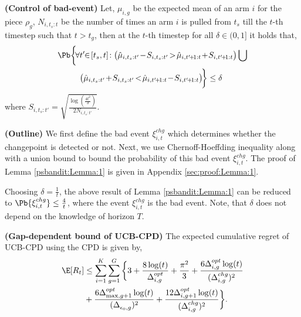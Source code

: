 
\begin{customlemma}{3} \textbf{(Control of bad-event)}
\label{psbandit:Lemma:1}
Let, $\mu_{i,g}$ be the expected mean of an arm $i$ for the piece $\rho_{g}$, $N_{i,t_s:t}$ be the number of times an arm $i$ is pulled from $t_s$ till the $t$-th timestep such that $t>t_{g}$, then at the $t$-th timestep for all $\delta\in (0,1]$  it holds that,
\begin{align*}
\Pb\bigg\lbrace\!\forall & t'\!\!\in\! [t_s , t]\!: \big(\hat{\mu}_{i,t_s:t'} \!-\! S_{i,t_s:t'} \!>\! \hat{\mu}_{i,t'\!+\!1:t} \!+\! S_{i,t'\!+\!1:t}\big) \bigcup\\
 & \big(\hat{\mu}_{i,t_s:t'} \!+\!  S_{i,t_s:t'} \!<\! \hat{\mu}_{i,t'\!+\!1:t} \!-\! S_{i,t'\!+\!1:t} \big)\!\bigg\rbrace \leq \delta
\end{align*}
where $S_{i,t_s:t'} = \sqrt{\frac{\log(\frac{4t^2}{\delta})}{2N_{i,t_s:t'}}}$.
\end{customlemma}

\begin{customproof}{2} \textbf{(Outline)} We first define the bad event $\xi^{chg}_{i,t}$  which determines whether the changepoint is detected or not. Next, we use Chernoff-Hoeffding inequality along with a union bound to bound the probability of this bad event $\xi^{chg}_{i,t}$.
The proof of Lemma \ref{psbandit:Lemma:1} is given in Appendix \ref{sec:proof:Lemma:1}.
\end{customproof}

\begin{remark}
\label{Rem:1}
Choosing $\delta=\frac{1}{t}$, the above result of Lemma \ref{psbandit:Lemma:1} can be reduced to $\Pb\lbrace \xi^{chg}_{i,t}\rbrace \leq \frac{4}{t}$, where the event $\xi^{chg}_{i,t}$ is the bad event. Note, that $\delta$ does not depend on the knowledge of horizon $T$.
\end{remark}


\begin{customtheorem}{1}\textbf{(Gap-dependent bound of UCB-CPD)}
\label{psbandit:Theorem:1}
The expected cumulative regret of UCB-CPD using the CPD is given by,
\begin{align*}
\E[R_t]  &\leq \sum_{i=1}^{K}\sum_{g=1}^{G} \bigg\lbrace 3 + \dfrac{8\log(t)}{\Delta^{opt}_{i,g}} + \dfrac{\pi^2}{3} + \dfrac{6\Delta^{opt}_{i,g}\log(t)}{(\Delta^{chg}_{i,g})^2} \\
& + \dfrac{6\Delta^{opt}_{\max,g+1}\log(t)}{(\Delta^{}_{\epsilon_0, g})^{2}} + \dfrac{12\Delta^{opt}_{i,g+1}\log(t)}{(\Delta^{chg}_{i,g})^{2}}\bigg\rbrace.
\end{align*}

\end{customtheorem}


